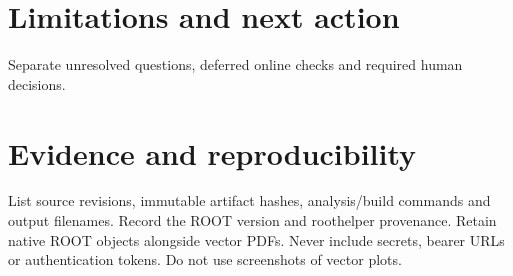 \documentclass{ldconreport}
\begin{document}
\section{Limitations and next action}
Separate unresolved questions, deferred online checks and required human decisions.
\section{Evidence and reproducibility}
List source revisions, immutable artifact hashes, analysis/build commands and output filenames.
Record the ROOT version and roothelper provenance. Retain native ROOT objects alongside vector PDFs.
Never include secrets, bearer URLs or authentication tokens. Do not use screenshots of vector plots.
\end{document}
